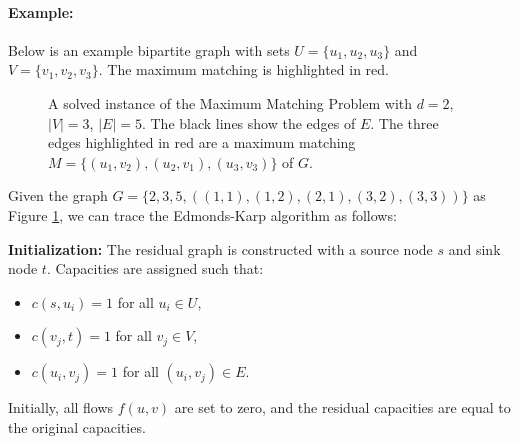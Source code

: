 \paragraph{Example:}
Below is an example bipartite graph with sets \( U = \{ u_1, u_2, u_3 \} \) and \( V = \{ v_1, v_2, v_3 \} \). The maximum matching is highlighted in red.

\begin{figure}[h!]
\centering
{}
\caption{A solved instance of the Maximum Matching Problem with $d = 2$, $|V| = 3$, $|E| = 5$. The black lines show the edges of $E$. The three edges highlighted in red are a maximum matching $M = \{ (u_1, v_2), (u_2, v_1), (u_3, v_3) \} $ of $G$.}
\label{fig:ex_bipartite_graph}
\end{figure}

\noindent Given the graph \( G = \{2, 3, 5, ((1,1), (1,2), (2,1), (3,2), (3,3)) \} \) as Figure \ref{fig:ex_bipartite_graph}, we can trace the Edmonds-Karp algorithm as follows:

\textbf{Initialization:} The residual graph is constructed with a source node \( s \) and sink node \( t \). Capacities are assigned such that:
\begin{itemize}
    \item \( c(s, u_i) = 1 \) for all \( u_i \in U \),
    \item \( c(v_j, t) = 1 \) for all \( v_j \in V \),
    \item \( c(u_i, v_j) = 1 \) for all \( (u_i, v_j) \in E \).
\end{itemize}
\par Initially, all flows \( f(u, v) \) are set to zero, and the residual capacities are equal to the original capacities.\\

